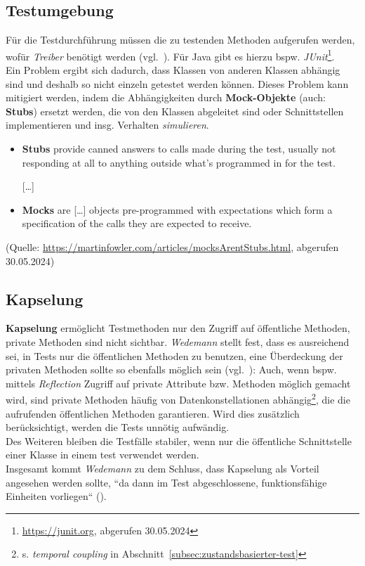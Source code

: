 \subsection*{Testumgebung}
Für die Testdurchführung müssen die zu testenden Methoden aufgerufen werden, wofür \textit{Treiber} benötigt werden (vgl.~\cite[55]{Wed09c}).
Für Java gibt es hierzu bspw. \textit{JUnit}\footnote{
\url{https://junit.org}, abgerufen 30.05.2024
}.\\
Ein Problem ergibt sich dadurch, dass Klassen von anderen Klassen abhängig sind und deshalb so nicht einzeln getestet werden können.
Dieses Problem kann mitigiert werden, indem die Abhängigkeiten durch \textbf{Mock-Objekte} (auch: \textbf{Stubs}) ersetzt werden, die von den Klassen abgeleitet sind oder Schnittstellen implementieren und insg. Verhalten \textit{simulieren}.\\

\begin{tcolorbox}[title=Unterschied Mock / Stub]
    \begin{itemize}
        \item \textbf{Stubs} provide canned answers to calls made during the test, usually not responding at all to anything outside what's programmed in for the test.
        \item[] [\ldots]
        \item \textbf{Mocks} are [\ldots] objects pre-programmed with expectations which form a specification of the calls they are expected to receive.
    \end{itemize}
    \noindent
    (Quelle: \url{https://martinfowler.com/articles/mocksArentStubs.html}, abgerufen 30.05.2024)
\end{tcolorbox}

\subsection*{Kapselung}
\textbf{Kapselung} ermöglicht Testmethoden nur den Zugriff auf öffentliche Methoden, private Methoden sind nicht sichtbar.
\textit{Wedemann} stellt fest, dass es ausreichend sei, in Tests nur die öffentlichen Methoden zu benutzen, eine Überdeckung der privaten Methoden sollte so ebenfalls möglich sein (vgl.~\cite[56]{Wed09c}): Auch, wenn bspw. mittels \textit{Reflection} Zugriff auf private Attribute bzw. Methoden möglich gemacht wird, sind private Methoden häufig von Datenkonstellationen abhängig\footnote{
s. \textit{temporal coupling} in Abschnitt~\ref{subsec:zustandsbasierter-test}
}, die die aufrufenden öffentlichen Methoden garantieren.
Wird dies zusätzlich berücksichtigt, werden die Tests unnötig aufwändig.\\
Des Weiteren bleiben die Testfälle stabiler, wenn nur die öffentliche Schnittstelle einer Klasse in einem test verwendet werden.\\
Insgesamt kommt \textit{Wedemann} zu dem Schluss, dass Kapselung als Vorteil angesehen werden sollte, ``da dann im Test abgeschlossene, funktionsfähige Einheiten vorliegen`` (\cite[56]{Wed09c}).

